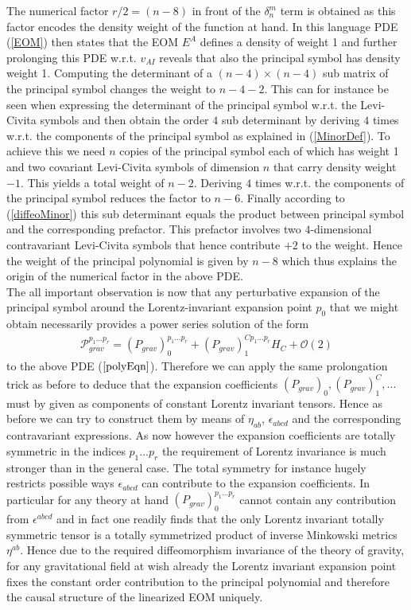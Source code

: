 \documentclass[a4paper,12pt, DIV=14, BCOR=5mm, twoside, headsepline]{scrbook}
\begin{document}
The numerical factor $r/2 = (n-8)$ in front of the $\delta^m_n$ term is obtained as this factor encodes the density weight of the function at hand. In this language PDE (\ref{EOM}) then states that the EOM $E^A$ defines a density of weight 1 and further prolonging this PDE w.r.t. $v_{AI}$ reveals that also the principal symbol has density weight 1. Computing the determinant of a $(n-4) \times (n-4)$ sub matrix of the principal symbol changes the weight to $n-4-2$. This can for instance be seen when expressing the determinant of the principal symbol w.r.t. the Levi-Civita symbols and then obtain the order $4$ sub determinant by deriving $4$ times w.r.t. the components of the principal symbol as explained in (\ref{MinorDef}). To achieve this  we need $n$ copies of the principal symbol each of which has weight 1 and two covariant Levi-Civita symbols of dimension $n$ that carry density weight $-1$. This yields a total weight of $n-2$. Deriving $4$ times w.r.t. the components of the principal symbol reduces the factor to $n-6$. Finally according to (\ref{diffeoMinor}) this sub determinant equals the product between principal symbol and the corresponding prefactor. This prefactor involves two $4$-dimensional contravariant Levi-Civita symbols that hence contribute $+2$ to the weight. Hence the weight of the principal polynomial is given by $n-8$ which thus explains the origin of the numerical factor in the above PDE. \\ 

The all important observation is now that any perturbative expansion of the principal symbol around the Lorentz-invariant expansion point $p_0$ that we might obtain necessarily provides a power series solution of the form
\begin{align}
    \mathcal{P}_{grav}^{{p_1}...{p_{r}}} = (P_{grav})^{{p_1}...{p_{r}}}_0 + (P_{grav})_1^{C{p_1}...{p_{r}}} H_C + \mathcal{O}(2)
\end{align}
to the above PDE ($\ref{polyEqn}$). Therefore we can apply the same prolongation trick as before to deduce that the expansion coefficients $(P_{grav})_0, (P_{grav})_1^C,...$ must by given as components of constant Lorentz invariant tensors. Hence as before we can try to construct them by means of $\eta_{ab}$, $\epsilon_{abcd}$ and the corresponding contravariant expressions. As now however the expansion coefficients are totally symmetric in the indices $p_1...p_r$ the requirement of Lorentz invariance is much stronger than in the general case. The total symmetry for instance hugely restricts possible ways $\epsilon_{abcd}$ can contribute to the expansion coefficients. In particular for any theory at hand $(P_{grav})_0^{{p_1}...{p_{r}}}$ cannot contain any contribution from $\epsilon^{abcd}$ and in fact one readily finds that the only Lorentz invariant totally symmetric tensor is a totally symmetrized product of inverse Minkowski metrics $\eta^{ab}$. Hence due to the required diffeomorphism invariance of the theory of gravity, for any gravitational field at wish already the Lorentz invariant expansion point fixes the constant order contribution to the principal polynomial and therefore the causal structure of the linearized EOM uniquely.\\
\end{document}
